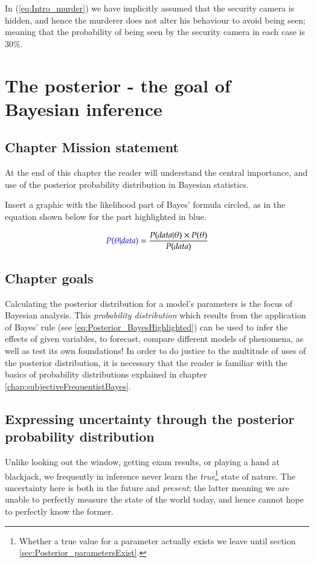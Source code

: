 \documentclass[11pt,fullpage]{book}
\begin{document}
In (\ref{eq:Intro_murder}) we have implicitly assumed that the security camera is hidden, and hence the murderer does not alter his behaviour to avoid being seen; meaning that the probability of being seen by the security camera in each case is 30\%. 

\chapter{The posterior - the goal of Bayesian inference}\label{chap:posterior}
\section{Chapter Mission statement}
At the end of this chapter the reader will understand the central importance, and use of the posterior probability distribution in Bayesian statistics.

Insert a graphic with the likelihood part of Bayes' formula circled, as in the equation shown below for the part highlighted in blue.

\begin{equation}
{\color{blue}P(\theta|data)} = \frac{P(data|\theta)\times P(\theta)}{P(data)}
\end{equation}\label{eq:Posterior_BayesHighlighted}

\section{Chapter goals}
Calculating the posterior distribution for a model's parameters is the focus of Bayesian analysis. This \textit{probability distribution} which results from the application of Bayes' rule (see \ref{eq:Posterior_BayesHighlighted}) can be used to infer the effects of given variables, to forecast, compare different models of phenomena, as well as test its own foundations! In order to do justice to the multitude of uses of the posterior distribution, it is necessary that the reader is familiar with the basics of probability distributions explained in chapter \ref{chap:subjectiveFrequentistBayes}. 

\section{Expressing uncertainty through the posterior probability distribution}\label{sec:Posterior_parameterUncertainty}
Unlike looking out the window, getting exam results, or playing a hand at blackjack, we frequently in inference never learn the \textit{true}\footnote{Whether a true value for a parameter actually exists we leave until section \ref{sec:Posterior_parametersExist}.} state of nature. The uncertainty here is both in the future and \textit{present}; the latter meaning we are unable to perfectly measure the state of the world today, and hence cannot hope to perfectly know the former.
\end{document}
